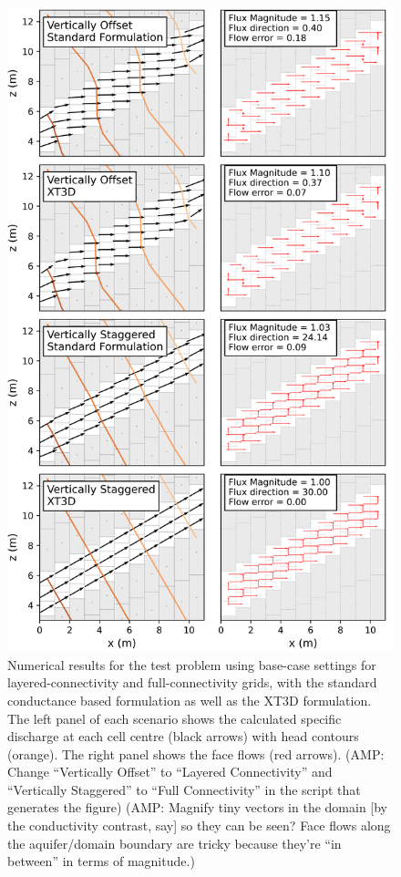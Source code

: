 \documentclass{article}
\begin{document}
\begin{figure}[p!]
	\begin{center}
	\includegraphics[scale=0.8]{../figures/fig2_paper.png}
	\caption{Numerical results for the test problem using base-case settings for layered-connectivity and full-connectivity grids, with the standard conductance based formulation as well as the XT3D formulation. The left panel of each scenario shows the calculated specific discharge at each cell centre (black arrows) with head contours (orange). The right panel shows the face flows (red arrows). {\color{red} (AMP: Change ``Vertically Offset'' to ``Layered Connectivity'' and ``Vertically Staggered'' to ``Full Connectivity'' in the script that generates the figure)} {\color{red} (AMP: Magnify tiny vectors in the domain [by the conductivity contrast, say] so they can be seen? Face flows along the aquifer/domain boundary are tricky because they're ``in between'' in terms of magnitude.)}}
	\label{fig:fig2}
	\end{center}
\end{figure}
\end{document}
